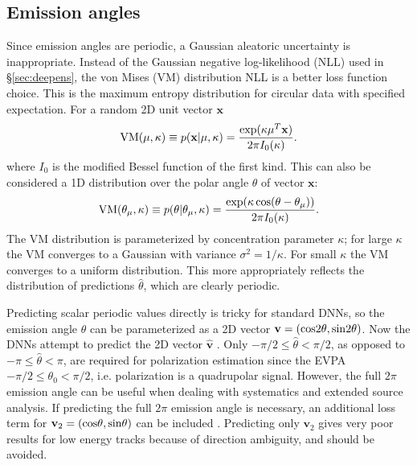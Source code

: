 \subsection{Emission angles} 
Since emission angles are periodic, a Gaussian aleatoric uncertainty is inappropriate.
Instead of the Gaussian negative log-likelihood (NLL) used in \S\ref{sec:deepens}, the von Mises (VM) distribution NLL is a better loss function choice. This is the maximum entropy distribution for circular data with specified expectation. For a random 2D unit vector $\mathbf{x}$
\begin{equation}
    {\rm VM}(\mathbf{\mu},\kappa) \equiv p(\mathbf{x}|\mathbf{\mu},\kappa) = \frac{\exp (\kappa \mathbf{\mu}^T\mathbf{x})}{2\pi I_0(\kappa)}.
\end{equation}
where $I_0$ is the modified Bessel function of the first kind.
This can also be considered a 1D distribution over the polar angle $\theta$ of vector $\mathbf{x}$:
\begin{equation}
    {\rm VM}(\theta_{\mu},\kappa) \equiv p(\theta|\theta_{\mu},\kappa) = \frac{\exp (\kappa \cos(\theta - \theta_{\mu}))}{2\pi I_0(\kappa)}.
\end{equation}
The VM distribution is parameterized by concentration parameter $\kappa$; for large $\kappa$ the VM converges to a Gaussian with variance $\sigma^2 = 1/\kappa$. For small $\kappa$ the VM converges to a uniform distribution.
This more appropriately reflects the distribution of predictions $\hat{\theta}$, which are clearly periodic.

Predicting scalar periodic values directly is tricky for standard DNNs, so the emission angle $\theta$ can be parameterized as a 2D vector $\mathbf{v} = (\rm{cos}2\theta,\rm{sin}2\theta)$. Now the DNNs attempt to predict the 2D vector $\hat{\mathbf{v}}$ \citep{peirson_deep_2021}. Only $-\pi/2 \leq \hat{\theta} < \pi/2$, as opposed to $-\pi \leq \hat{\theta} < \pi$, are required for polarization estimation since the EVPA $-\pi/2 \leq \theta_0 < \pi/2$, i.e. polarization is a quadrupolar signal. However, the full $2\pi$ emission angle can be useful when dealing with systematics and extended source analysis. If predicting the full $2\pi$ emission angle is necessary, an additional loss term for $\mathbf{v}_2 = (\rm{cos}\theta,\rm{sin}\theta)$ can be included \citep{peirson_deep_2021}. Predicting only $\mathbf{v}_2$ gives very poor results for low energy tracks because of direction ambiguity, and should be avoided.


